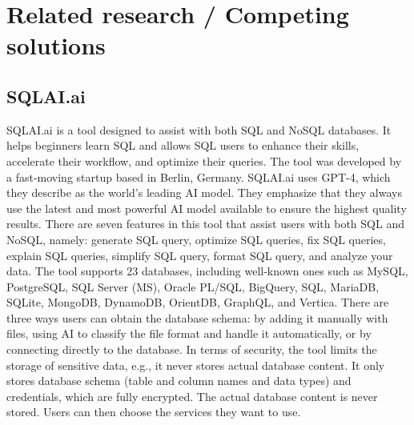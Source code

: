 \section{Related research / Competing solutions}
    \subsection{SQLAI.ai}
    SQLAI.ai is a tool designed to assist with both SQL and NoSQL databases. It helps beginners learn SQL and allows SQL users to enhance their skills, accelerate their workflow, and optimize their queries. The tool was developed by a fast-moving startup based in Berlin, Germany. SQLAI.ai uses GPT-4, which they describe as the world's leading AI model. They emphasize that they always use the latest and most powerful AI model available to ensure the highest quality results. There are seven features in this tool that assist users with both SQL and NoSQL, namely: generate SQL query, optimize SQL queries, fix SQL queries, explain SQL queries, simplify SQL query, format SQL query, and analyze your data. The tool supports 23 databases, including well-known ones such as MySQL, PostgreSQL, SQL Server (MS), Oracle PL/SQL, BigQuery, SQL, MariaDB, SQLite, MongoDB, DynamoDB, OrientDB, GraphQL, and Vertica. There are three ways users can obtain the database schema: by adding it manually with files, using AI to classify the file format and handle it automatically, or by connecting directly to the database. In terms of security, the tool limits the storage of sensitive data, e.g., it never stores actual database content. It only stores database schema (table and column names and data types) and credentials, which are fully encrypted. The actual database content is never stored. Users can then choose the services they want to use.
    \cite{SQLAI}

